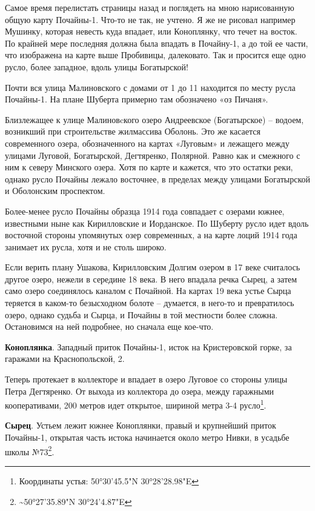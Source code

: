 Самое время перелистать страницы назад и поглядеть на мною нарисованную общую карту Почайны-1. Что-то не так, не учтено. Я же не рисовал например Мушинку, которая невесть куда впадает, или Коноплянку, что течет на восток. По крайней мере последняя должна была впадать в Почайну-1, а до той ее части, что изображена на карте выше Пробивицы, далековато. Так и просится еще одно русло, более западное, вдоль улицы Богатырской!

Почти вся улица Малиновского с домами от 1 до 11 находится по месту русла Почайны-1. На плане Шуберта примерно там обозначено «оз Пичаня».

Близлежащее к улице Малиновcкого озеро Андреевское (Богатырское) – водоем, возникший при строительстве жилмассива Оболонь. Это же касается современного озера, обозначенного на картах «Луговым» и лежащего между улицами Луговой, Богатырской, Дегтяренко, Полярной. Равно как и смежного с ним к северу Минского озера. Хотя по карте и кажется, что это остатки реки, однако русло Почайны лежало восточнее, в пределах между улицами Богатырской и Оболонским проспектом.

Более-менее русло Почайны образца 1914 года совпадает с озерами южнее, известными ныне как Кирилловские и Иорданское. По Шуберту русло идет вдоль восточной стороны упомянутых озер современных, а на карте лоций 1914 года занимает их русла, хотя и не столь широко.

Если верить плану Ушакова, Кирилловским Долгим озером в 17 веке считалось другое озеро, нежели в середине 18 века. В него впадала речка Сырец, а затем само озеро соединялось каналом с Почайной. На картах 19 века устье Сырца теряется в каком-то безысходном болоте – думается, в него-то и превратилось озеро, однако судьба и Сырца, и Почайны в той местности более сложна. Остановимся на ней подробнее, но сначала еще кое-что.

\textbf{Коноплянка}. Западный приток Почайны-1, исток на Кристеровской горке, за гаражами на Краснопольской, 2. 

Теперь протекает в коллекторе и впадает в озеро Луговое со стороны улицы Петра Дегтяренко. От выхода из коллектора до озера, между гаражными кооперативами, 200 метров идет открытое, шириной метра 3-4 русло\footnote{Координаты устья: 50°30'45.5"N 30°28'28.98"E}. 

\textbf{Сырец}. Устьем лежит южнее Коноплянки, правый и крупнейший приток Почайны-1, открытая часть истока начинается около метро Нивки, в усадьбе школы №73\footnote{\textasciitilde{}50°27'35.89"N  30°24'4.87"E}.

